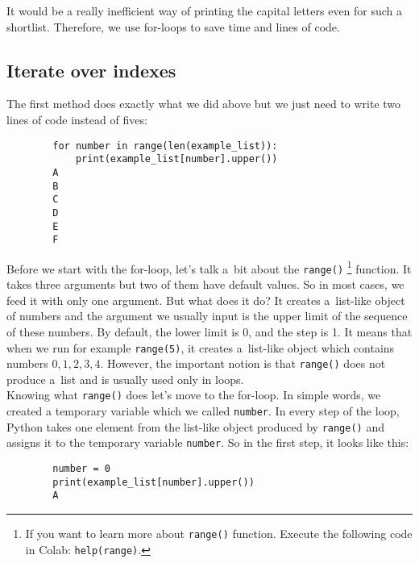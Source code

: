 \documentclass{article}
\begin{document}
\noindent It would be a really inefficient way of printing the capital letters even for such a shortlist. Therefore, we use for-loops to save time and lines of code.

\subsection*{Iterate over indexes}
The first method does exactly what we did above but we just need to write two lines of code instead of fives:
\begin{center}
    \begin{verbatim}
        for number in range(len(example_list)):
            print(example_list[number].upper())
        A
        B
        C
        D
        E
        F
    \end{verbatim}
\end{center}

\noindent Before we start with the for-loop, let's talk a~bit about the \texttt{range()} \footnote{If you want to learn more about \texttt{range()} function. Execute the following code in Colab: \texttt{help(range)}.} function. It takes three arguments but two of them have default values. So in most cases, we feed it with only one argument. But what does it do? It creates a~list-like object of numbers and the argument we usually input is the upper limit of the sequence of these numbers. By default, the lower limit is 0, and the step is 1. It means that when we run for example \texttt{range(5)}, it creates a~list-like object which contains numbers $0, 1, 2, 3, 4$. However, the important notion is that \texttt{range()} does not produce a~list and is usually used only in loops.\\

\noindent Knowing what \texttt{range()} does let's move to the for-loop. In simple words, we created a temporary variable which we called \texttt{number}. In every step of the loop, Python takes one element from the list-like object produced by \texttt{range()} and assigns it to the temporary variable \texttt{number}. So in the first step, it looks like this:

\begin{center}
    \begin{verbatim}
        number = 0
        print(example_list[number].upper())
        A
    \end{verbatim}
\end{center}
\end{document}
